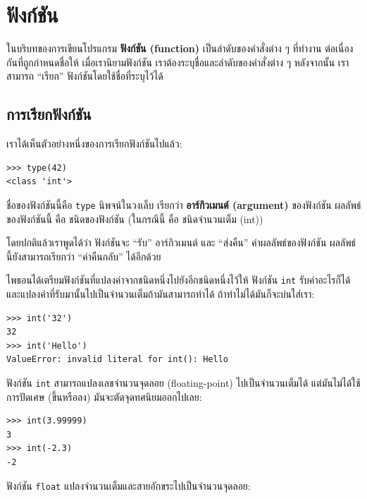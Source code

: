 \chapter{ฟังก์ชัน } %
\label{funcchap}


ในบริบทของการเขียนโปรแกรม {\bf ฟังก์ชัน (function)} เป็นลำดับของคำสั่งต่าง ๆ ที่ทำงาน
ต่อเนื่องกันที่ถูกกำหนดชื่อให้  เมื่อเรานิยามฟังก์ชัน เราต้องระบุชื่อและลำดับของคำสั่งต่าง ๆ 
หลังจากนั้น เราสามารถ ``เรียก'' ฟังก์ชันโดยใช้ชื่อที่ระบุไว้ได้

\section{การเรียกฟังก์ชัน} %
\label{functionchap}

เราได้เห็นตัวอย่างหนึ่งของการเรียกฟังก์ชันไปแล้ว:

\begin{verbatim}
>>> type(42)
<class 'int'>
\end{verbatim}
%
ชื่อของฟังก์ชันนี้คือ {\tt type} นิพจน์ในวงเล็บ เรียกว่า {\bf อาร์กิวเมนต์ (argument)} ของฟังก์ชัน
ผลลัพธ์ของฟังก์ชันนี้ คือ ชนิดของฟังก์ชัน (ในกรณีนี้ คือ ชนิดจำนวนเต็ม (int))  

โดยปกติแล้วเราพูดได้ว่า ฟังก์ชันจะ ``รับ'' อาร์กิวเมนต์ และ ``ส่งคืน'' ค่าผลลัพธ์ของฟังก์ชัน
ผลลัพธ์นี้ยังสามารถเรียกว่า ``ค่าคืนกลับ'' ได้อีกด้วย 

ไพธอนได้เตรียมฟังก์ชันที่แปลงค่าจากชนิดหนึ่งไปยังอีกชนิดหนึ่งไว้ให้ ฟังก์ชัน {\tt int} รับค่าอะไรก็ได้
และแปลงค่าที่รับมานั้นไปเป็นจำนวนเต็มถ้ามันสามารถทำได้ ถ้าทำไม่ได้มันก็จะบ่นใส่เรา: 

\begin{verbatim}
>>> int('32')
32
>>> int('Hello')
ValueError: invalid literal for int(): Hello
\end{verbatim}
%
ฟังก์ชัน {\tt int} สามารถแปลงเลขจำนวนจุดลอย (floating-point) ไปเป็นจำนวนเต็มได้
แต่มันไม่ได้ใช้การปัดเศษ (ขึ้นหรือลง) มันจะตัดจุดทศนิยมออกไปเลย: 

\begin{verbatim}
>>> int(3.99999)
3
>>> int(-2.3)
-2
\end{verbatim}
%
ฟังก์ชัน {\tt float} แปลงจำนวนเต็มและสายอักขระไปเป็นจำนวนจุดลอย:

